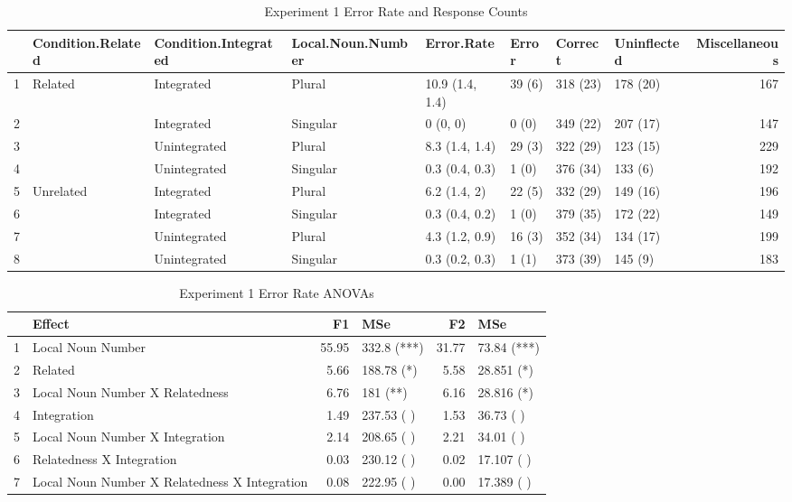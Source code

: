 \documentclass[a4paper,11pt]{article}\usepackage[]{graphicx}\usepackage[]{color}
\begin{document}
\begin{landscape}
\begin{table}[ht]
\centering
\begin{tabular}{rlllllllr}
  \hline
 & Condition.Related & Condition.Integrated & Local.Noun.Number & Error.Rate & Error & Correct & Uninflected & Miscellaneous \\ 
  \hline
1 & Related & Integrated & Plural & 10.9 (1.4, 1.4) & 39 (6) & 318 (23) & 178 (20) & 167 \\ 
  2 &   & Integrated & Singular & 0 (0, 0) & 0 (0) & 349 (22) & 207 (17) & 147 \\ 
  3 &   & Unintegrated & Plural & 8.3 (1.4, 1.4) & 29 (3) & 322 (29) & 123 (15) & 229 \\ 
  4 &   & Unintegrated & Singular & 0.3 (0.4, 0.3) & 1 (0) & 376 (34) & 133 (6) & 192 \\ 
  5 & Unrelated & Integrated & Plural & 6.2 (1.4, 2) & 22 (5) & 332 (29) & 149 (16) & 196 \\ 
  6 &   & Integrated & Singular & 0.3 (0.4, 0.2) & 1 (0) & 379 (35) & 172 (22) & 149 \\ 
  7 &   & Unintegrated & Plural & 4.3 (1.2, 0.9) & 16 (3) & 352 (34) & 134 (17) & 199 \\ 
  8 &   & Unintegrated & Singular & 0.3 (0.2, 0.3) & 1 (1) & 373 (39) & 145 (9) & 183 \\ 
   \hline
\end{tabular}
\caption[Exp1. Errors and Responses]{Experiment 1 Error Rate and Response Counts} 
\end{table}

\end{landscape}
\begin{table}[ht]
\centering
\begin{tabular}{rlrlrl}
  \hline
 & Effect & F1 & MSe & F2 & MSe \\ 
  \hline
1 & Local Noun Number & 55.95 & 332.8 (***) & 31.77 & 73.84 (***) \\ 
  2 & Related & 5.66 & 188.78 (*) & 5.58 & 28.851 (*) \\ 
  3 & Local Noun Number X Relatedness & 6.76 & 181 (**) & 6.16 & 28.816 (*) \\ 
  4 & Integration & 1.49 & 237.53 ( ) & 1.53 & 36.73 ( ) \\ 
  5 & Local Noun Number X Integration & 2.14 & 208.65 ( ) & 2.21 & 34.01 ( ) \\ 
  6 & Relatedness X Integration & 0.03 & 230.12 ( ) & 0.02 & 17.107 ( ) \\ 
  7 & Local Noun Number X Relatedness X Integration & 0.08 & 222.95 ( ) & 0.00 & 17.389 ( ) \\ 
   \hline
\end{tabular}
\caption[Exp.1 Error ANOVAs]{Experiment 1 Error Rate ANOVAs} 
\end{table}
\end{document}
